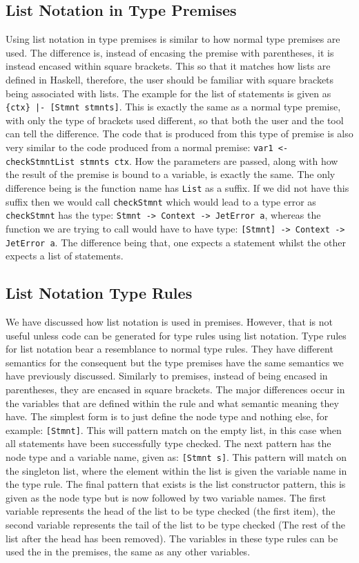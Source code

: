 \subsection{List Notation in Type Premises}
Using list notation in type premises is similar to how normal type premises are used.
The difference is, instead of encasing the premise with parentheses, it is instead encased within square brackets.
This so that it matches how lists are defined in Haskell, therefore, the user should be familiar with square brackets being associated with lists.
The example for the list of statements is given as \texttt{\{ctx\} |- [Stmnt stmnts]}.
This is exactly the same as a normal type premise, with only the type of brackets used different, so that both the user and the tool can tell the difference.
The code that is produced from this type of premise is also very similar to the code produced from a normal premise: \texttt{var1 <- checkStmntList stmnts ctx}.
How the parameters are passed, along with how the result of the premise is bound to a variable, is exactly the same.
The only difference being is the function name has \texttt{List} as a suffix.
If we did not have this suffix then we would call \texttt{checkStmnt} which would lead to a type error as \texttt{checkStmnt} has the type: \texttt{Stmnt -> Context -> JetError a}, whereas the function we are trying to call would have to have type: \texttt{[Stmnt] -> Context -> JetError a}.
The difference being that, one expects a statement whilst the other expects a list of statements.

\subsection{List Notation Type Rules}
We have discussed how list notation is used in premises.
However, that is not useful unless code can be generated for type rules using list notation.
Type rules for list notation bear a resemblance to normal type rules.
They have different semantics for the consequent but the type premises have the same semantics we have previously discussed.
Similarly to premises, instead of being encased in parentheses, they are encased in square brackets.
The major differences occur in the variables that are defined within the rule and what semantic meaning they have.
The simplest form is to just define the node type and nothing else, for example: \texttt{[Stmnt]}.
This will pattern match on the empty list, in this case when all statements have been successfully type checked.
The next pattern has the node type and a variable name, given as: \texttt{[Stmnt s]}.
This pattern will match on the singleton list, where the element within the list is given the variable name in the type rule.
The final pattern that exists is the list constructor pattern, this is given as the node type but is now followed by two variable names.
The first variable represents the head of the list to be type checked (the first item), the second variable represents the tail of the list to be type checked (The rest of the list after the head has been removed).
The variables in these type rules can be used the in the premises, the same as any other variables.

